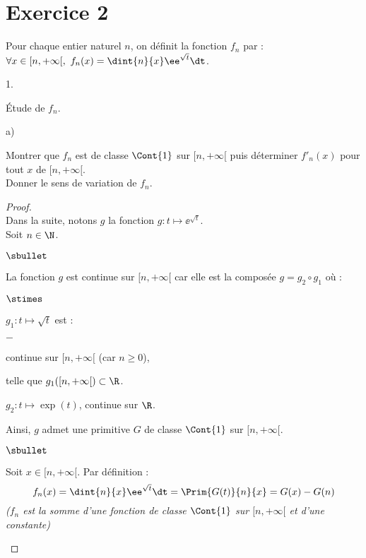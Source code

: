 \documentclass[11pt]{article}%
\begin{document}


\section*{Exercice 2}
\noindent
Pour chaque entier naturel $n$, on définit la fonction $f_{n}$ par :
$\forall x\in[n, + \infty[, \ f_{n}(x) = \dint{n}{x} \ee^{\sqrt{t}} \dt$.
\begin{noliste}{1.}
  \setlength{\itemsep}{4mm}
\item Étude de $f_{n}$.
  \begin{noliste}{a)}
    \setlength{\itemsep}{2mm}
  \item Montrer que $f_{n}$ est de classe $\Cont{1}$ sur $[n, +
    \infty[$ puis déterminer $f'_{n}(x)$ pour tout $x$ de $[n,
    +\infty[$.\\
    Donner le sens de variation de $f_{n}$.

    \begin{proof}~\\%
      Dans la suite, notons $g$ la fonction $g : t \mapsto
      \ee^{\sqrt{t}}$.\\
      Soit $n \in \N$.
      \begin{noliste}{$\sbullet$}
      \item La fonction $g$ est continue sur $[n, +\infty[$ car elle
        est la composée $g = g_2 \circ g_1$ où :
      \end{noliste}
      \begin{noliste}{$\stimes$}
      \item $g_1 : t \mapsto \sqrt{t}$ est :
        \begin{liste}{$-$}
        \item continue sur $[n, +\infty[$ (car $n \geq 0$),
        \item telle que $g_1([n, +\infty[) \subset \R$.
        \end{liste}
      \item $g_2 : t \mapsto \exp(t)$, continue sur $\R$.
      \end{noliste}
      Ainsi, $g$ admet une primitive $G$ de classe $\Cont{1}$ sur $[n,
      +\infty[$.
      \begin{noliste}{$\sbullet$}
      \item Soit $x \in [n, +\infty[$. Par définition :
        \[
        f_n(x) = \dint{n}{x} \ee^{\sqrt{t}} \dt = \Prim{G(t)}{n}{x} =
        G(x)- G(n)
        \]        
        \conc{La fonction $f_n$ est de classe $\Cont{1}$ sur
          $[n,+\infty[$ car $G$ l'est.}%
        {\it ($f_n$ est la somme d'une fonction de classe $\Cont{1}$
          sur $[n,+\infty[$ et d'une constante)}%


\end{noliste}
\end{proof}
\end{noliste}
\end{noliste}
\end{document}
